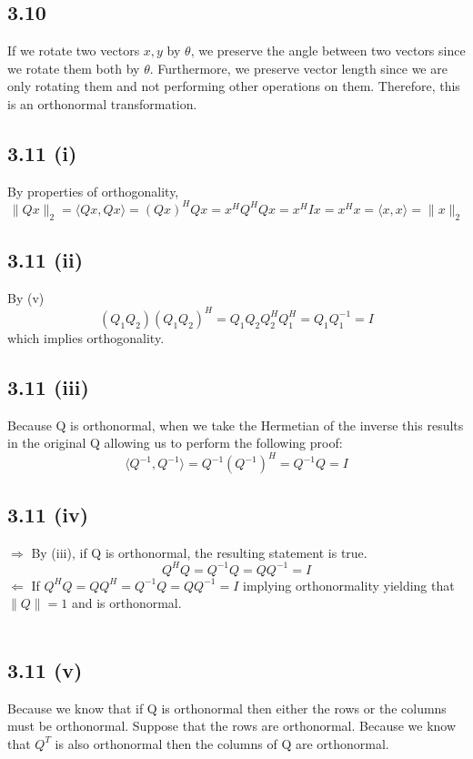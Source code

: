 \documentclass[letterpaper,12pt]{article}
\theoremstyle{definition}
\begin{document}
\subsection*{3.10}
If we rotate two vectors $x,y$ by $\theta$, we preserve the angle between two vectors since we rotate them both by $\theta$. Furthermore, we preserve vector length since we are only rotating them and not performing other operations on them. Therefore, this is an orthonormal transformation.




\subsection*{3.11 (i)}
By properties of orthogonality,
\[   \|Qx\|_{2} =  \langle Qx,Qx \rangle = (Qx)^HQx = x^HQ^HQx = x^HIx = x^Hx = \langle x,x\rangle = \|x\|_{2}  \]
\subsection*{3.11 (ii)}
By (v) 
\[(Q_{1}Q_{2})(Q_{1}Q_{2})^H = Q_{1}Q_{2}Q_{2}^HQ_{1}^H= Q_{1}Q_{1}^{-1} = I \]
which implies orthogonality.
\subsection*{3.11 (iii)}
Because Q is orthonormal, when we take the Hermetian of the inverse this results in the original Q allowing us to perform the following proof:
\[\langle Q^{-1},Q^{-1}\rangle = Q^{-1}(Q^{-1})^H = Q^{-1}Q = I\]
\subsection*{3.11 (iv)}
$\Rightarrow$ By (iii), if Q is orthonormal, the resulting statement is true. 
\[Q^HQ = Q^{-1}Q= QQ^{-1} = I\]
$\Leftarrow$ If $Q^HQ=QQ^H=Q^{-1}Q=QQ^{-1}=I$ implying orthonormality yielding that $\|Q\| = 1$ and is orthonormal. \\ \\
\subsection*{3.11 (v)}
Because we know that if Q is orthonormal then either the rows or the columns must be orthonormal. Suppose that the rows are orthonormal. Because we know that $Q^{T}$ is also orthonormal then the columns of Q are orthonormal. \\ \\
\end{document}
